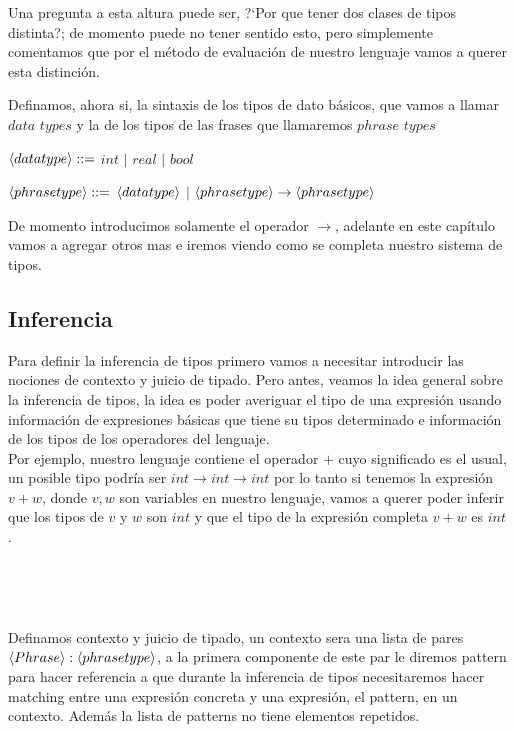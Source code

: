 Una pregunta a esta altura puede ser, ?`Por que tener dos clases de tipos 
distinta?; de momento puede no tener sentido esto, pero simplemente
comentamos que por el m\'etodo de evaluaci\'on de nuestro lenguaje
vamos a querer esta distinci\'on.\

Definamos, ahora si, la sintaxis de los tipos de dato b\'asicos, 
que vamos a llamar $data$ $types$ y la de los tipos de las frases que
llamaremos $phrase$ $types$ 

\begin{center} $\langle data type \rangle ::=$ $int$ $|$ $real$ $|$ $bool$ \end{center}

\begin{center} 
$\langle phrase type \rangle::=$ $\langle data type \rangle$ $|$ $\langle phrase type \rangle \rightarrow \langle phrase type \rangle$
\end{center}

De momento introducimos solamente el operador $\rightarrow$, adelante en este 
cap\'itulo vamos a agregar otros mas e iremos viendo como se completa nuestro
sistema de tipos.\

\subsection{Inferencia}
Para definir la inferencia de tipos primero vamos a necesitar introducir las 
nociones de contexto y juicio de tipado. Pero antes, veamos la idea general
sobre la inferencia de tipos, la idea es poder averiguar el tipo de una expresi\'on
usando informaci\'on de expresiones b\'asicas que tiene su tipos determinado e
informaci\'on de los tipos de los operadores del lenguaje.\\
Por ejemplo, nuestro lenguaje contiene el operador $+$ cuyo significado
es el usual, un posible tipo podr\'ia ser $int \rightarrow int \rightarrow int$
por lo tanto si tenemos la expresi\'on $v + w$, donde $v,w$ son variables en
nuestro lenguaje, vamos a querer poder inferir que los tipos de $v$ y $w$ son
$int$ y que el tipo de la expresi\'on completa $v + w$ es $int$.\

\

\

\noindent Definamos contexto y juicio de tipado, un contexto sera una lista de 
pares $\langle Phrase \rangle:\langle phrase type \rangle$, a la primera componente de este 
par le diremos pattern para hacer referencia a que durante la inferencia de tipos
necesitaremos hacer matching entre una expresi\'on concreta y una expresi\'on, el
pattern, en un contexto. Adem\'as la lista de patterns no tiene elementos repetidos.

